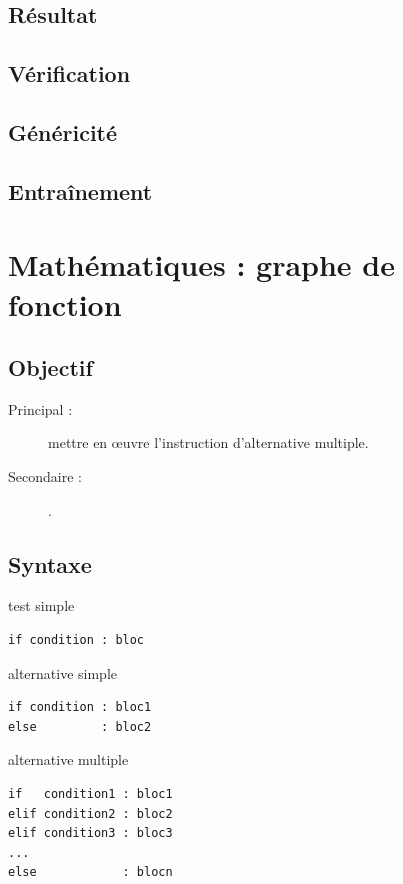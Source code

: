 \subsection{Résultat}\label{tests:figures:resultat}

\subsection{Vérification}\label{tests:figures:verification}

\subsection{Généricité}\label{tests:figures:genericite}

\subsection{Entraînement}\label{tests:figures:entrainement}

\section{Mathématiques : graphe de fonction}

\subsection{Objectif}\label{tests:maths:objectif}
\begin{description}
\item[Principal : ] mettre en \oe uvre l'instruction d'alternative multiple.
\item[Secondaire :] .
\end{description}

\subsection{Syntaxe \python}\label{tests:maths:python}
\noindent\begin{minipage}[t]{0.3\textwidth}
test simple\footnotesize
\begin{Verbatim}
if condition : bloc
\end{Verbatim}
\end{minipage}
\hfill
\begin{minipage}[t]{0.3\textwidth}
alternative simple\footnotesize
\begin{Verbatim}
if condition : bloc1
else         : bloc2
\end{Verbatim}
\end{minipage}
\hfill
\begin{minipage}[t]{0.3\textwidth}
alternative multiple\footnotesize
\begin{Verbatim}
if   condition1 : bloc1
elif condition2 : bloc2
elif condition3 : bloc3
...
else            : blocn
\end{Verbatim}
\end{minipage}

